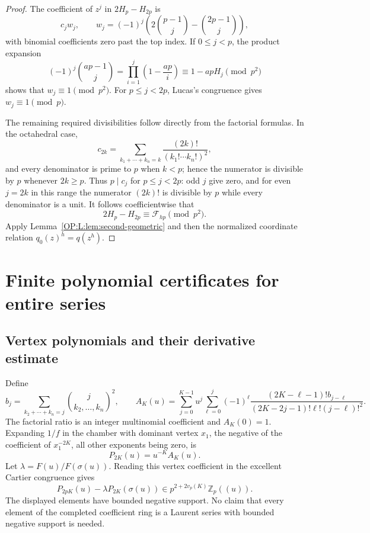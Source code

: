 \documentclass[11pt,a4paper]{article}
\theoremstyle{definition}\newtheorem{definition}[theorem]{Definition}
\theoremstyle{remark}\newtheorem{remark}[theorem]{Remark}
\newcommand{\Z}{\mathbb Z}
\newcommand{\vp}{v_p}
\numberwithin{equation}{section}
\begin{document}
\begin{proof}
The coefficient of \(z^j\) in \(2H_p-H_{2p}\) is
\[
 c_jw_j,\qquad
 w_j=(-1)^j\left(2\binom{p-1}{j}-\binom{2p-1}{j}\right),
\]
with binomial coefficients zero past the top index.  If \(0\leq j<p\),
the product expansion
\[
 (-1)^j\binom{ap-1}{j}
 =\prod_{i=1}^j\left(1-\frac{ap}{i}\right)
 \equiv1-apH_j\pmod{p^2}
\]
shows that \(w_j\equiv1\pmod{p^2}\).
For \(p\leq j<2p\), Lucas's congruence gives
\(w_j\equiv1\pmod p\).

The remaining required divisibilities follow directly from the
factorial formulas.  In the octahedral case,
\[
 c_{2k}=\sum_{k_1+\cdots+k_n=k}
              \frac{(2k)!}{(k_1!\cdots k_n!)^2},
\]
and every denominator is prime to \(p\) when \(k<p\); hence the
numerator is divisible by $p$ whenever $2k\ge p$.
Thus $p\mid c_j$ for $p\le j<2p$: odd $j$ give zero,
and for even $j=2k$ in this range the numerator $(2k)!$ is divisible
by $p$ while every denominator is a unit.
It follows coefficientwise that
\[
 2H_p-H_{2p}\equiv\mathcal F_{hp}\pmod{p^2}.
\]
Apply Lemma~\ref{OP:L:lem:second-geometric} and then the normalized
coordinate relation \(q_0(z)^h=q(z^h)\).
\end{proof}


\section{Finite polynomial certificates for entire series}\label{OP:source-main-7}\label{OP:sec:cert-framework}
\subsection{Vertex polynomials and their derivative estimate}
Define
\[
 b_j=\sum_{k_2+\cdots+k_n=j}\binom{j}{k_2,\ldots,k_n}^{\!2},\qquad
 A_K(u)=\sum_{j=0}^{K-1}u^j\sum_{\ell=0}^j(-1)^\ell
 \frac{(2K-\ell-1)!b_{j-\ell}}
 {(2K-2j-1)!\ell!(j-\ell)!^2}.
\]
The factorial ratio is an integer multinomial coefficient and $A_K(0)=1$.
Expanding $1/f$ in the chamber with dominant vertex $x_1$, the negative
of the coefficient of $x_1^{-2K}$, all other exponents being zero, is
\[
 P_{2K}(u)=u^{-K}A_K(u).
\]
Let $\lambda=F(u)/F(\sigma(u))$. Reading this vertex coefficient in
the excellent Cartier congruence gives
\begin{equation}\label{OP:eq:vertex}
 P_{2pK}(u)-\lambda P_{2K}(\sigma(u))
       \in p^{2+2\vp(K)}\Z_p((u)).
\end{equation}
The displayed elements have bounded negative support. No claim that every
element of the completed coefficient ring is a Laurent series with bounded
negative support is needed.
\end{document}
